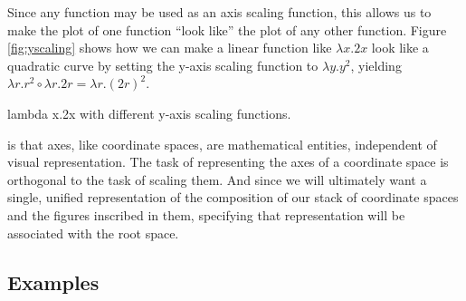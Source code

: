 \documentclass[12pt]{tufte-handout}
\numberwithin{equation}{subsection}
\numberwithin{equation}{subsection}
\begin{document}
  Since any function may be used as an axis scaling function, this
  allows us to make the plot of one function ``look like'' the plot of
  any other function.  Figure \ref{fig:yscaling} shows how we can make a
  linear function like \(\lambda x.2x\) look like a quadratic curve by setting the y-axis
  scaling function to \(\lambda y.y^2\), yielding \(\lambda
  r.r^2\circ\lambda r.2r = \lambda r.(2r)^2\).

  \begin{marginfigure}[12pt]%
    \hspace{8pt}
    \vspace{12pt}
    \caption{lambda x.2x with different y-axis scaling functions.}
    \label{fig:yscaling}
  \end{marginfigure}%

   is that axes, like coordinate
  spaces, are mathematical entities, independent of visual
  representation.  The task of representing the axes of a coordinate
  space is orthogonal to the task of scaling them.  And since we will
  ultimately want a single, unified representation of the composition of
  our stack of coordinate spaces and the figures inscribed in them,
  specifying that representation will be associated with the root
  space.

  \subsection{Examples}
  \label{subs:axiseg}
\end{document}
